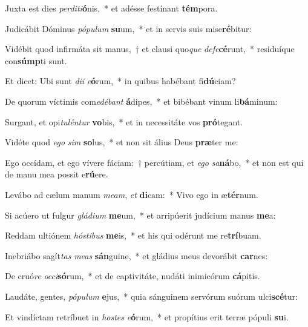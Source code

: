\item Juxta est dies \textit{per}\textit{di}\textit{ti}\textbf{ó}nis,~* et adésse festínant \textbf{tém}pora.
\item Judicábit Dóminus \textit{pó}\textit{pu}\textit{lum} \textbf{su}um,~* et in servis suis mise\textbf{ré}bitur:
\item Vidébit quod infirmáta sit manus,~† et clausi quo\textit{que} \textit{de}\textit{fe}\textbf{cé}runt,~* residuíque con\textbf{súmp}ti sunt.
\item Et dicet: Ubi sunt \textit{di}\textit{i} \textit{e}\textbf{ó}rum,~* in quibus habébant fi\textbf{dú}ciam?
\item De quorum víctimis com\textit{e}\textit{dé}\textit{bant} \textbf{á}dipes,~* et bibébant vinum li\textbf{bá}minum:
\item Surgant, et opi\textit{tu}\textit{lén}\textit{tur} \textbf{vo}bis,~* et in necessitáte vos \textbf{pró}tegant.
\item Vidéte quod \textit{e}\textit{go} \textit{sim} \textbf{so}lus,~* et non sit álius Deus \textbf{præ}ter me:
\item Ego occídam, et ego vívere fáciam:~† percútiam, et \textit{e}\textit{go} \textit{sa}\textbf{ná}bo,~* et non est qui de manu mea possit e\textbf{rú}ere.
\item Levábo ad cælum manum \textit{me}\textit{am}, \textit{et} \textbf{di}cam:~* Vivo ego in æ\textbf{tér}num.
\item Si acúero ut fulgur \textit{glá}\textit{di}\textit{um} \textbf{me}um,~* et arripúerit judícium manus \textbf{me}a:
\item Reddam ultiónem \textit{hós}\textit{ti}\textit{bus} \textbf{me}is,~* et his qui odérunt me re\textbf{trí}buam.
\item Inebriábo sagít\textit{tas} \textit{me}\textit{as} \textbf{sán}guine,~* et gládius meus devorábit \textbf{car}nes:
\item De cruó\textit{re} \textit{oc}\textit{ci}\textbf{só}rum,~* et de captivitáte, nudáti inimicórum \textbf{cá}pitis.
\item Laudáte, gentes, \textit{pó}\textit{pu}\textit{lum} \textbf{e}jus,~* quia sánguinem servórum suórum ulci\textbf{scé}tur:
\item Et vindíctam retríbuet in \textit{hos}\textit{tes} \textit{e}\textbf{ó}rum,~* et propítius erit terræ pópuli \textbf{su}i.
